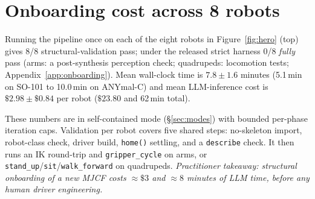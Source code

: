 \section{Onboarding cost across 8 robots}
\label{sec:onboarding}



Running the pipeline once on each of the eight robots in
Figure~\ref{fig:hero} (top) gives 8/8 structural-validation pass;
under the released strict harness 0/8 \emph{fully} pass (arms: a
post-synthesis perception check; quadrupeds: locomotion tests;
Appendix~\ref{app:onboarding}). Mean
wall-clock time is $7.8 \pm 1.6$ minutes (5.1\,min on SO-101 to
10.0\,min on ANYmal-C) and mean LLM-inference cost is
$\$2.98 \pm \$0.84$ per robot ($\$23.80$ and 62\,min total).

These numbers are in self-contained mode (\S\ref{sec:modes})
with bounded per-phase iteration caps. Validation
per robot covers five shared steps: no-skeleton import, robot-class
check, driver build, \texttt{home()} settling, and a \texttt{describe} check. It
then runs an IK round-trip and \texttt{gripper\_cycle} on arms, or
\texttt{stand\_up}/\texttt{sit}/\texttt{walk\_forward} on quadrupeds.
\emph{Practitioner takeaway: structural onboarding of a new MJCF
costs ${\approx}\$3$ and ${\approx}8$ minutes of LLM time, before
any human driver engineering.}
